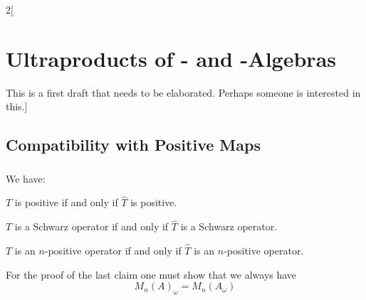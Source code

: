 \documentclass[%
	,english 
	,headings	= small 
	,leqno
	,parskip		= half+
	,DIV			= 14
	,BCOR 			= 10mm	
		]{scrartcl}
\begin{document}
\begin{multicols}{2}[%
\section*{Ultraproducts of \CA- and \WA-Algebras}
This is a first draft that needs to be elaborated. Perhaps someone is interested in this.]
\subsection*{Compatibility with Positive Maps}
\subsubsection{}
We have:
%
\begin{myenumerate}
	
	\item
	$ T $ is positive if and only if $ \hat{ T } $ is positive.
	
	\item
	$ T $ is a Schwarz operator if and only if $ \hat{ T } $ is a Schwarz operator.
	
	\item
	$ T $ is an $ n $-positive operator if and only if $ \hat{ T } $ is an $ n $-positive operator.
\end{myenumerate}
%
For the proof of the last claim one must show that we always have
%
\[
    M_{ n }( A )_{ \omega } = M_{ n }( A _{ \omega } )
\]
%
\printbibliography
\end{multicols}
%
\end{document}
